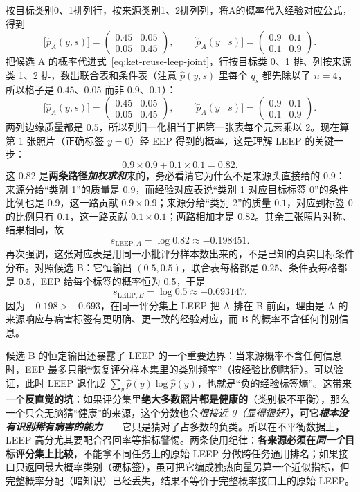 按目标类别0、1排列行，按来源类别1、2排列列，将A的概率代入经验对应公式，得到
\[
  \bigl[\hat p_A(y,s)\bigr]=
  \begin{pmatrix}0.45&0.05\\0.05&0.45\end{pmatrix},
  \qquad
  \bigl[\hat p_A(y\mid s)\bigr]=
  \begin{pmatrix}0.9&0.1\\0.1&0.9\end{pmatrix}.
\]
把候选 A 的概率代进式~\eqref{eq:ket-reuse-leep-joint}，行按目标类 0、1 排、列按来源类 1、2 排，数出联合表和条件表（注意 $\hat p(y,s)$ 里每个 $q_s$ 都先除以了 $n=4$，所以格子是 $0.45$、$0.05$ 而非 $0.9$、$0.1$）：
\[
  \bigl[\hat p_A(y,s)\bigr]=
  \begin{pmatrix}0.45&0.05\\0.05&0.45\end{pmatrix},
  \qquad
  \bigl[\hat p_A(y\mid s)\bigr]=
  \begin{pmatrix}0.9&0.1\\0.1&0.9\end{pmatrix}.
\]
两列边缘质量都是 $0.5$，所以列归一化相当于把第一张表每个元素乘以 2。现在算第 1 张照片（正确标签 $y=0$）经 EEP 得到的概率，这是理解 LEEP 的关键一步：
\[ 0.9\times0.9+0.1\times0.1=0.82. \]
这 0.82 是\textbf{两条路径\emph{加权求和}}来的，务必看清它为什么不是来源头直接给的 0.9：来源分给“类别 1”的质量是 $0.9$，而经验对应表说“类别 1 对应目标标签 0”的条件比例也是 $0.9$，这一路贡献 $0.9\times0.9$；来源分给“类别 2”的质量 $0.1$，对应到标签 0 的比例只有 $0.1$，这一路贡献 $0.1\times0.1$；两路相加才是 0.82。其余三张照片对称、结果相同，故
\[ s_{\mathrm{LEEP},A}=\log 0.82\approx-0.198451. \]
再次强调，这张对应表是用同一小批评分样本数出来的，不是已知的真实目标条件分布。对照候选 B：它恒输出 $(0.5,0.5)$，联合表每格都是 $0.25$、条件表每格都是 $0.5$，EEP 给每个标签的概率恒为 0.5，于是
\[ s_{\mathrm{LEEP},B}=\log0.5\approx-0.693147. \]
因为 $-0.198>-0.693$，在同一评分集上 LEEP 把 A 排在 B 前面，理由是 A 的来源响应与病害标签有更明确、更一致的经验对应，而 B 的概率不含任何判别信息。

候选 B 的恒定输出还暴露了 LEEP 的一个重要边界：当来源概率不含任何信息时，EEP 最多只能“恢复评分样本集里的类别频率”（按经验比例瞎猜）。可以验证，此时 LEEP 退化成 $\sum_y\hat p(y)\log\hat p(y)$，也就是“负的经验标签熵”。这带来一个\textbf{反直觉的坑}：如果评分集里\textbf{绝大多数照片都是健康的}（类别极不平衡），那么一个只会无脑猜“健康”的来源，这个分数也会\emph{很接近 0（显得很好）}，\textbf{可它\emph{根本没有识别稀有病害的能力}}——它只是猜对了占多数的负类。所以在不平衡数据上，LEEP 高分尤其要配合召回率等指标警惕。两条使用纪律：\textbf{各来源必须在\emph{同一个}目标评分集上比较}，不能拿不同任务上的原始 LEEP 分做跨任务通用排名；如果接口只返回最大概率类别（硬标签），虽可把它编成独热向量另算一个近似指标，但完整概率分配（暗知识）已经丢失，结果不等价于完整概率接口上的原始 LEEP。


